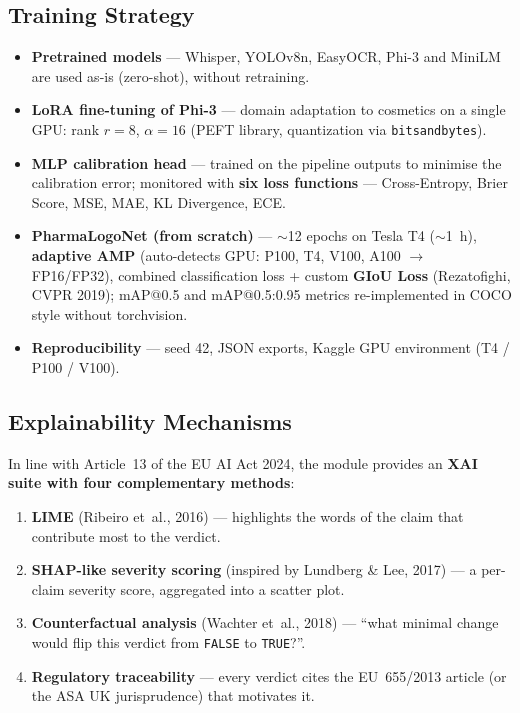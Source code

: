 \documentclass[11pt,a4paper]{article}
\newcommand{\verdict}[1]{\texttt{#1}}
\begin{document}
\subsection{Training Strategy}

\begin{itemize}[noitemsep]
  \item \textbf{Pretrained models} --- Whisper, YOLOv8n, EasyOCR, Phi-3 and
  MiniLM are used as-is (zero-shot), without retraining.
  \item \textbf{LoRA fine-tuning of Phi-3} --- domain adaptation to cosmetics on a
  single GPU: rank $r=8$, $\alpha=16$ (PEFT library, quantization via
  \texttt{bitsandbytes}).
  \item \textbf{MLP calibration head} --- trained on the pipeline outputs to
  minimise the calibration error; monitored with \textbf{six loss functions} ---
  Cross-Entropy, Brier Score, MSE, MAE, KL Divergence, ECE.
  \item \textbf{PharmaLogoNet (from scratch)} --- $\sim$12 epochs on Tesla T4
  ($\sim$1~h), \textbf{adaptive AMP} (auto-detects GPU: P100, T4, V100, A100 $\to$
  FP16/FP32), combined classification loss + custom \textbf{GIoU Loss}
  (Rezatofighi, CVPR 2019); mAP@0.5 and mAP@0.5:0.95 metrics re-implemented in
  COCO style without torchvision.
  \item \textbf{Reproducibility} --- seed 42, JSON exports, Kaggle GPU
  environment (T4 / P100 / V100).
\end{itemize}

\subsection{Explainability Mechanisms}

In line with Article~13 of the EU AI Act 2024, the module provides an
\textbf{XAI suite with four complementary methods}:

\begin{enumerate}[label=\textbf{(\alph*)}, noitemsep]
  \item \textbf{LIME} (Ribeiro et~al., 2016) --- highlights the words of the claim
  that contribute most to the verdict.
  \item \textbf{SHAP-like severity scoring} (inspired by Lundberg \& Lee, 2017) ---
  a per-claim severity score, aggregated into a scatter plot.
  \item \textbf{Counterfactual analysis} (Wachter et~al., 2018) --- ``what minimal
  change would flip this verdict from \verdict{FALSE} to \verdict{TRUE}?''.
  \item \textbf{Regulatory traceability} --- every verdict cites the EU~655/2013
  article (or the ASA UK jurisprudence) that motivates it.
\end{enumerate}
\end{document}
